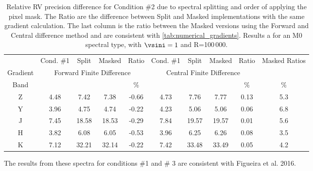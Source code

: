 
\begin{table}
    \caption{Relative {RV} precision difference for Condition \#2 due to spectral splitting and order of applying the pixel mask. The Ratio are the difference between Split and Masked implementations with the same gradient calculation. The last column is the ratio between the Masked versions using the Forward and Central difference method and are consistent with \cref{tab:numerical_gradients}. Results a for an M0 spectral type, with $\vsini=1$ and R=100\,000.}
    \begin{tabular}{c|cccc|cccc|c}
        \toprule
        & Cond. \#1 & Split & Masked & Ratio &  Cond. \#1 & Split & Masked & Ratio & Masked Ratios\\
        Gradient &  \multicolumn{4}{c|}{Forward Finite Difference}  &  \multicolumn{4}{c|}{Central Finite Difference} & \\

        Band & \mps{} & \mps{} & \mps{} &  \%  & \mps{} & \mps{} & \mps{} &   \% & \% \\
        \midrule

        Z & 4.48 &  7.42 &  7.38 & -0.66 &  4.73 &  7.76 &  7.77 & 0.13 & 5.3\\
        Y & 3.96 &  4.75 &  4.74 & -0.22 &  4.23 &  5.06 &  5.06 & 0.06 & 6.8\\
        J & 7.45 & 18.58 & 18.53 & -0.29 &  7.84 & 19.57 & 19.57 & 0.01 & 5.6\\
        H & 3.82 &  6.08 &  6.05 & -0.53 &  3.96 &  6.25 &  6.26 & 0.08 & 3.5\\
        K & 7.12 & 32.21 & 32.14 & -0.22 &  7.42 & 33.48 & 33.49 & 0.05 & 4.2\\
        \bottomrule
    \end{tabular}
\end{table}

{\red{} The results from these spectra for conditions \#1 and \# 3 are consistent with Figueira et al. 2016. }
